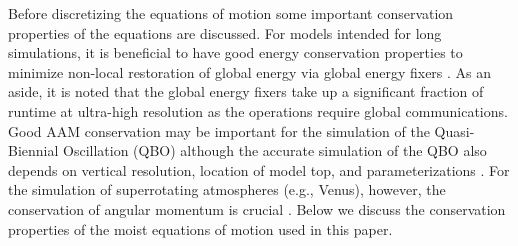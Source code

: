 \documentclass{agujournal}
\begin{document}
{Before discretizing the equations of motion some important conservation properties of the equations are discussed. For models intended for long simulations, it is beneficial to have good energy conservation properties to minimize non-local restoration of global energy via  global energy fixers \citep[e.g.][]{T2008JCP}. As an aside, it is noted that the global energy fixers take up a significant fraction of runtime at ultra-high resolution as the operations require global communications. Good AAM conservation may be important for the simulation of the Quasi-Biennial Oscillation (QBO) although the accurate simulation of the QBO also depends on vertical resolution, location of model top, {\color{red}{model dissipation (numerical and physical)}} and parameterizations \citep[such as nonorographic gravity wave drag {\color{red}{and convection parameterization}}; ][]{RSB2014JGR}. For the simulation of superrotating atmospheres (e.g., Venus), however, the conservation of angular momentum is crucial \citep{LCGPSWLJ2012JGR}. Below we discuss the conservation properties of the moist equations of motion used in this paper.
}
\end{document}
